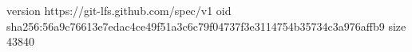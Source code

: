 version https://git-lfs.github.com/spec/v1
oid sha256:56a9c76613e7edac4ce49f51a3c6c79f04737f3e3114754b35734c3a976affb9
size 43840
